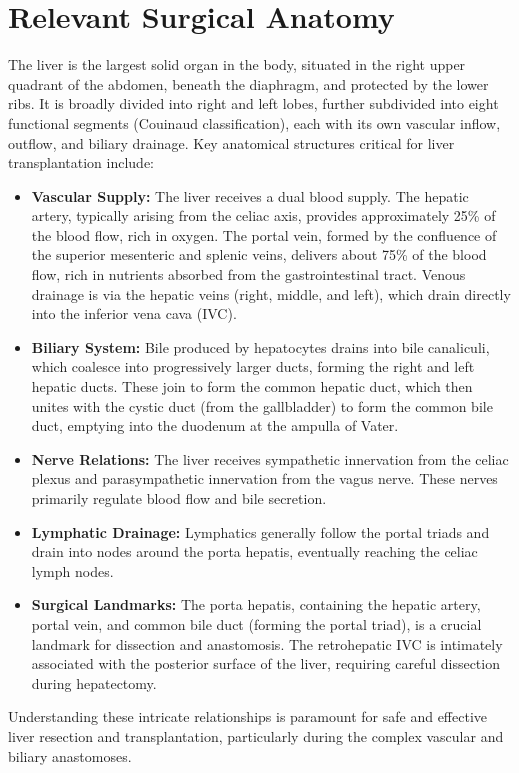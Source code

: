 \section*{Relevant Surgical Anatomy}
The liver is the largest solid organ in the body, situated in the right upper quadrant of the abdomen, beneath the diaphragm, and protected by the lower ribs. It is broadly divided into right and left lobes, further subdivided into eight functional segments (Couinaud classification), each with its own vascular inflow, outflow, and biliary drainage. Key anatomical structures critical for liver transplantation include:
\begin{itemize}
  \item \textbf{Vascular Supply:} The liver receives a dual blood supply. The hepatic artery, typically arising from the celiac axis, provides approximately 25\% of the blood flow, rich in oxygen. The portal vein, formed by the confluence of the superior mesenteric and splenic veins, delivers about 75\% of the blood flow, rich in nutrients absorbed from the gastrointestinal tract. Venous drainage is via the hepatic veins (right, middle, and left), which drain directly into the inferior vena cava (IVC).
  \item \textbf{Biliary System:} Bile produced by hepatocytes drains into bile canaliculi, which coalesce into progressively larger ducts, forming the right and left hepatic ducts. These join to form the common hepatic duct, which then unites with the cystic duct (from the gallbladder) to form the common bile duct, emptying into the duodenum at the ampulla of Vater.
  \item \textbf{Nerve Relations:} The liver receives sympathetic innervation from the celiac plexus and parasympathetic innervation from the vagus nerve. These nerves primarily regulate blood flow and bile secretion.
  \item \textbf{Lymphatic Drainage:} Lymphatics generally follow the portal triads and drain into nodes around the porta hepatis, eventually reaching the celiac lymph nodes.
  \item \textbf{Surgical Landmarks:} The porta hepatis, containing the hepatic artery, portal vein, and common bile duct (forming the portal triad), is a crucial landmark for dissection and anastomosis. The retrohepatic IVC is intimately associated with the posterior surface of the liver, requiring careful dissection during hepatectomy.
\end{itemize}
Understanding these intricate relationships is paramount for safe and effective liver resection and transplantation, particularly during the complex vascular and biliary anastomoses.

